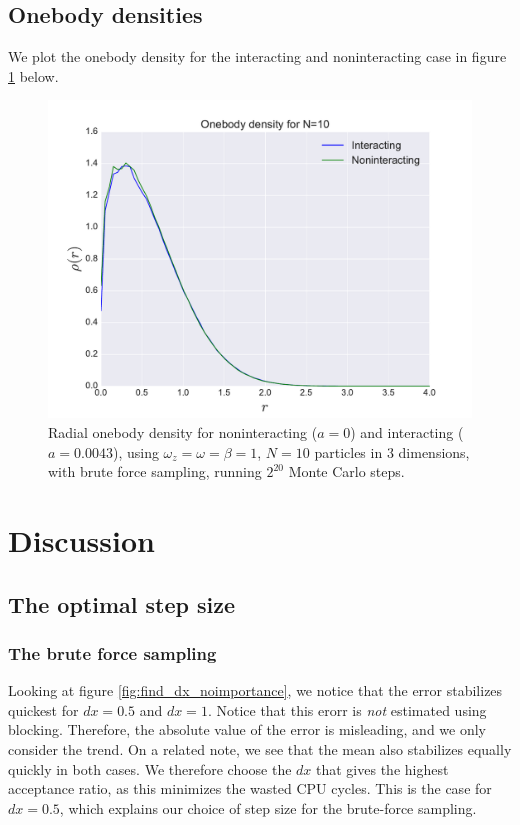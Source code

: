\documentclass[a4paper, 10pt]{article}
\begin{document}
	\subsection{Onebody densities}
	We plot the onebody density for the interacting and noninteracting case in figure \ref{fig:results_onebody} below.
		\begin{figure}[ht!]
			\centering
			\includegraphics[scale=0.8]{../Results/onbody.pdf}
			\caption{Radial onebody density for noninteracting ($a=0$) and interacting ($a=0.0043$), using $\omega_z=\omega=\beta=1$, $N=10$ particles in $3$ dimensions, with brute force sampling, running $2^{20}$ Monte Carlo steps.}\label{fig:results_onebody}
		\end{figure}
	\section{Discussion}
	\subsection{The optimal step size}
	\subsubsection{The brute force sampling}\label{sec:Disc_optimal_step_size_brute_force}
	Looking at figure \ref{fig:find_dx_noimportance}, we notice that the error stabilizes quickest for $dx=0.5$ and $dx=1$. Notice that this erorr is \textit{not} estimated using blocking. Therefore, the absolute value of the error is misleading, and we only consider the trend. On a related note, we see that the mean also stabilizes equally quickly in both cases. We therefore choose the $dx$ that gives the highest acceptance ratio, as this minimizes the wasted CPU cycles. This is the case for $dx=0.5$, which explains our choice of step size for the brute-force sampling.
\end{document}
